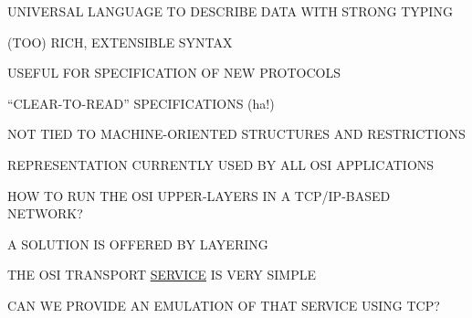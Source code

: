 \begin{bwslide}

\begin{nrtc}
\item	UNIVERSAL LANGUAGE TO DESCRIBE DATA WITH STRONG TYPING

\item	(TOO) RICH, EXTENSIBLE SYNTAX

\item	USEFUL FOR SPECIFICATION OF NEW PROTOCOLS
    \begin{nrtc}
    \item	``CLEAR-TO-READ'' SPECIFICATIONS (ha!)

    \item	NOT TIED TO MACHINE-ORIENTED STRUCTURES AND RESTRICTIONS
    \end{nrtc}

\item	REPRESENTATION CURRENTLY USED BY ALL OSI APPLICATIONS
\end{nrtc}
\end{bwslide}




\begin{bwslide}

\begin{nrtc}
\item	HOW TO RUN THE OSI UPPER-LAYERS IN A TCP/IP-BASED NETWORK?

\item	A SOLUTION IS OFFERED BY LAYERING
    \begin{nrtc}
    \item	THE OSI TRANSPORT \underline{SERVICE} IS VERY SIMPLE

    \item	CAN WE PROVIDE AN EMULATION OF THAT SERVICE USING TCP?
    \end{nrtc}
\end{nrtc}
\end{bwslide}




